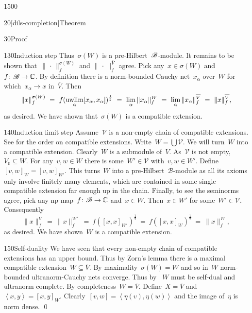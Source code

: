 \begin{parsec}{1500}
\begin{point}{20}[dils-completion]{Theorem}
\begin{point}{30}{Proof}
\begin{point}{130}{Induction step}
Thus~$\sigma(W)$ is a pre-Hilbert~$\mathscr{B}$-module.
It remains to be shown that~$\|\,\cdot\,\|_f^{\sigma(W)}$
    and $\|\,\cdot\,\|_f^{\overline{V}}$
    agree.
Pick any~$x \in \sigma(W)$ and~$f\colon \mathscr{B} \to \mathbb{C}$.
By definition there is a norm-bounded Cauchy net~$x_\alpha$ over~$W$
    for which~$x_\alpha \to x$ in~$\overline{V}$.
Then
\begin{equation*}
    \|x\|^{\sigma(W)}_f
       \ =\ f(\uwlim_\alpha [x_\alpha,x_\alpha])^{\frac{1}{2}}
       \ =\ \lim_\alpha \|x_\alpha\|_f^W
       \ =\ \lim_\alpha \|x_\alpha\|_f^{\overline{V}}
       \ =\ \|x\|_f^{\overline{V}},
\end{equation*}
as desired.
We have shown that~$\sigma(W)$ is a compatible extension.
\end{point}
\begin{point}{140}{Induction limit step}%
    Assume~$\mathscr{V}$
        is a non-empty chain of compatible extensions.
        See  for the order on compatible extensions.
    Write~$W = \bigcup \mathscr{V}$.
    We will turn~$W$ into a compatible extension.
    Clearly~$W$ is a submodule of~$\overline{V}$.
    As~$\mathscr{V}$ is not empty, $V_0 \subseteq W$.
    For any~$v,w \in W$
    there is some~$W' \in \mathscr{V}$ with~$v,w \in W'$.
    Define~$[v,w]_W = [v,w]_{W'}$.
    This turns~$W$ into a pre-Hilbert~$\mathscr{B}$-module
        as all its axioms only involve finitely many elements,
        which are contained in some single compatible extension far enough up
        in the chain.
    Finally, to see the seminorms agree,
        pick any np-map~$f\colon \mathscr{B} \to \mathbb{C}$
        and~$x \in W$.
    Then~$x \in W'$ for some~$W' \in \mathscr{V}$.
    Consequently
    \begin{equation*}
        \|x\|^{\overline{V}}_f
        \ =\ \|x\|^{W'}_f
        \ =\ f([x,x]_{W'})^{\frac{1}{2}}
        \ =\ f([x,x]_{W})^{\frac{1}{2}}
        \ =\  \|x\|^{W}_f,
    \end{equation*}
    as desired.  We have shown~$W$ is a compatible extension.
\end{point}
\begin{point}{150}{Self-duality}
    We have seen
    that every non-empty chain of compatible extensions
        has an upper bound.
    Thus by Zorn's lemma there is a maximal compatible
        extension~$W\subseteq \overline{V}$.
    By maximality~$\sigma(W) = W$
        and so in~$W$ norm-bounded ultranorm-Cauchy nets converge.
    Thus by~
        $W$ must be self-dual and ultranorm complete.
    By completeness~$W = \overline{V}$.
    Define~$X = \overline{V}$
        and~$\left<x,y\right> = [x,y]_{W}$.
    Clearly~$[v,w] = \left<\eta(v),\eta(w)\right>$
        and the image of~$\eta$ is norm dense. \qed
\end{point}
\end{point}
\end{point}
\end{parsec}
